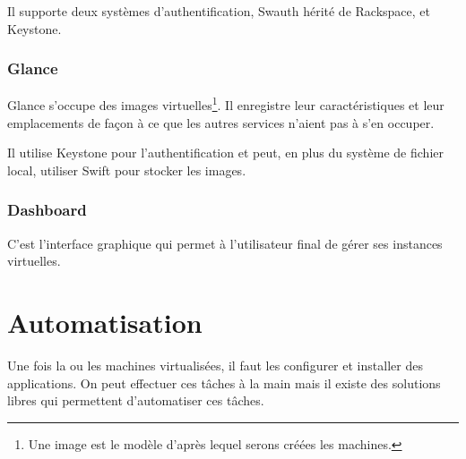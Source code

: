 \documentclass[a4paper,oneside]{report}
\begin{document}
Il supporte deux systèmes d'authentification, Swauth hérité de Rackspace, et Keystone.

\subsubsection{Glance}
Glance s'occupe des images virtuelles\footnote{Une image est le modèle d'après lequel serons créées les machines.}.
Il enregistre leur caractéristiques et leur emplacements de façon à ce que les autres services n'aient pas à s'en occuper.

Il utilise Keystone pour l'authentification et peut, en plus du système de fichier local, utiliser Swift pour stocker les images.

\subsubsection{Dashboard}
C'est l'interface graphique qui permet à l'utilisateur final de gérer ses instances virtuelles.

\section{Automatisation}

Une fois la ou les machines virtualisées, il faut les configurer et installer des applications. On peut effectuer ces tâches à la main mais il existe des solutions libres qui permettent d'automatiser ces tâches.
\end{document}
